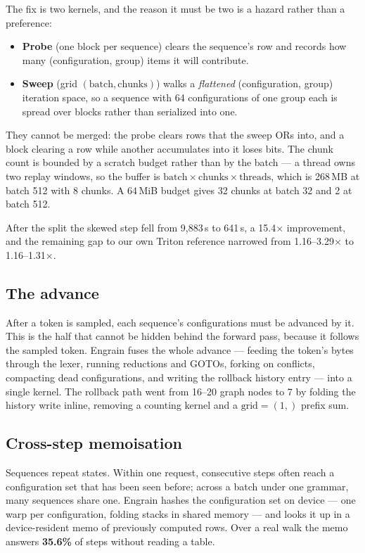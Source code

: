\documentclass{article}
\begin{document}
The fix is two kernels, and the reason it must be two is a hazard rather than a
preference:

\begin{itemize}
\item \textbf{Probe} (one block per sequence) clears the sequence's row and
records how many (configuration, group) items it will contribute.
\item \textbf{Sweep} (grid $(\text{batch}, \text{chunks})$) walks a
\emph{flattened} (configuration, group) iteration space, so a sequence with 64
configurations of one group each is spread over blocks rather than serialized
into one.
\end{itemize}

They cannot be merged: the probe clears rows that the sweep ORs into, and a
block clearing a row while another accumulates into it loses bits. The chunk
count is bounded by a scratch budget rather than by the batch --- a thread owns
two replay windows, so the buffer is $\text{batch} \times \text{chunks} \times
\text{threads}$, which is 268\,MB at batch 512 with 8 chunks. A 64\,MiB budget
gives 32 chunks at batch 32 and 2 at batch 512.

After the split the skewed step fell from 9{,}883\,\textmu{}s to
641\,\textmu{}s, a 15.4$\times$ improvement, and the remaining gap to our own
Triton reference narrowed from 1.16--3.29$\times$ to 1.16--1.31$\times$.

\subsection{The advance}

After a token is sampled, each sequence's configurations must be advanced by it.
This is the half that cannot be hidden behind the forward pass, because it
follows the sampled token. Engrain fuses the whole advance --- feeding the
token's bytes through the lexer, running reductions and GOTOs, forking on
conflicts, compacting dead configurations, and writing the rollback history
entry --- into a single kernel. The rollback path went from 16--20 graph nodes
to 7 by folding the history write inline, removing a counting kernel and a
$\text{grid}=(1,)$ prefix sum.

\subsection{Cross-step memoisation}
\label{sec:memo}

Sequences repeat states. Within one request, consecutive steps often reach a
configuration set that has been seen before; across a batch under one grammar,
many sequences share one. Engrain hashes the configuration set on device --- one
warp per configuration, folding stacks in shared memory --- and looks it up in a
device-resident memo of previously computed rows. Over a real walk the memo
answers \textbf{35.6\%} of steps without reading a table.
\end{document}
